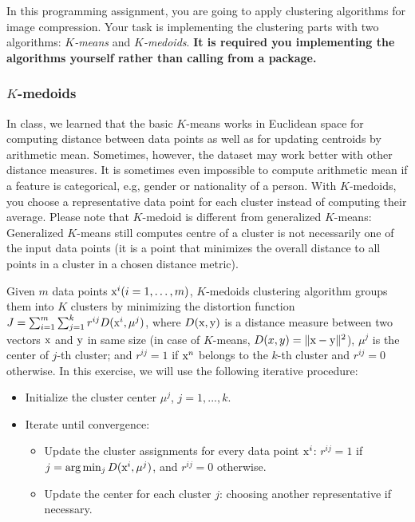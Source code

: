 \documentclass[twoside,10pt]{article}
\begin{document}
In this programming assignment, you are going to apply clustering algorithms for image compression. Your task is implementing the clustering parts with two algorithms: \emph{$K$-means} and \emph{$K$-medoids}.  {\bf It is required you implementing the algorithms yourself rather than calling from a package.} %

\subsubsection*{$K$-medoids}

In class, we learned that the basic $K$-means works in Euclidean space for computing distance between data points as well as for updating centroids by arithmetic mean. Sometimes, however, the dataset may work better with other distance measures. It is sometimes even impossible to compute arithmetic mean if a feature is categorical, e.g, gender or nationality of a person. With $K$-medoids, you choose a representative data point for each cluster instead of computing their average. Please note that $K$-medoid is different from generalized $K$-means: Generalized $K$-means still computes centre of a cluster is not necessarily one of the input data points (it is a point that minimizes the overall distance to all points in a cluster in a chosen distance metric). 

Given $m$ data points $\text x^i (i = 1, \ldots, m)$, $K$-medoids clustering algorithm groups them into $K$ clusters by minimizing the distortion function $J = \sum_{i=1}^m \sum_{j=1}^k r^{ij} D(\text x^i, \mu^j)$,
where $D(\text x, \text y)$ is a distance measure between two vectors $\text x$ and $\text y$ in same size (in case of $K$-means, $D(x, y) = \| \text x - \text y \|^2$), $\mu^j$ is the center of $j$-th cluster; and $r^{ij} = 1$ if $\text x^n$ belongs to the $k$-th cluster and $r^{ij} = 0$ otherwise. In this exercise, we will use the following iterative procedure:

\begin{itemize}
  \item Initialize the cluster center $\mu^j$, $j = 1, ..., k$.
  \item Iterate until convergence:
  \begin{itemize}
    \item Update the cluster assignments for every data point $\text x^i$: $r^{ij} = 1$ if $j = \arg\min_j D(\text x^i, \mu^j)$, and $r^{ij} = 0$ otherwise.
    \item Update the center for each cluster $j$: choosing another representative if necessary.
  \end{itemize}
\end{itemize}
\end{document}
